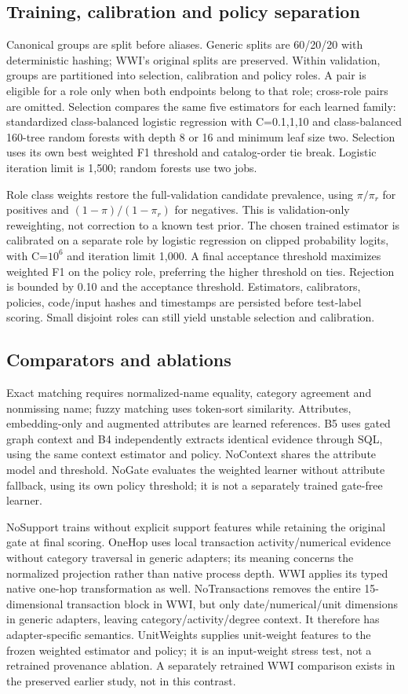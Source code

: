 \documentclass[11pt,letterpaper]{article}
\begin{document}
\subsection{Training, calibration and policy separation}
Canonical groups are split before aliases. Generic splits are 60/20/20 with deterministic hashing; WWI's original splits are preserved. Within validation, groups are partitioned into selection, calibration and policy roles. A pair is eligible for a role only when both endpoints belong to that role; cross-role pairs are omitted. Selection compares the same five estimators for each learned family: standardized class-balanced logistic regression with C=0.1,1,10 and class-balanced 160-tree random forests with depth 8 or 16 and minimum leaf size two. Selection uses its own best weighted F1 threshold and catalog-order tie break. Logistic iteration limit is 1,500; random forests use two jobs.

Role class weights restore the full-validation candidate prevalence, using $\pi/\pi_r$ for positives and $(1-\pi)/(1-\pi_r)$ for negatives. This is validation-only reweighting, not correction to a known test prior. The chosen trained estimator is calibrated on a separate role by logistic regression on clipped probability logits, with C=$10^6$ and iteration limit 1,000. A final acceptance threshold maximizes weighted F1 on the policy role, preferring the higher threshold on ties. Rejection is bounded by 0.10 and the acceptance threshold. Estimators, calibrators, policies, code/input hashes and timestamps are persisted before test-label scoring. Small disjoint roles can still yield unstable selection and calibration.

\subsection{Comparators and ablations}
Exact matching requires normalized-name equality, category agreement and nonmissing name; fuzzy matching uses token-sort similarity. Attributes, embedding-only and augmented attributes are learned references. B5 uses gated graph context and B4 independently extracts identical evidence through SQL, using the same context estimator and policy. NoContext shares the attribute model and threshold. NoGate evaluates the weighted learner without attribute fallback, using its own policy threshold; it is not a separately trained gate-free learner.

NoSupport trains without explicit support features while retaining the original gate at final scoring. OneHop uses local transaction activity/numerical evidence without category traversal in generic adapters; its meaning concerns the normalized projection rather than native process depth. WWI applies its typed native one-hop transformation as well. NoTransactions removes the entire 15-dimensional transaction block in WWI, but only date/numerical/unit dimensions in generic adapters, leaving category/activity/degree context. It therefore has adapter-specific semantics. UnitWeights supplies unit-weight features to the frozen weighted estimator and policy; it is an input-weight stress test, not a retrained provenance ablation. A separately retrained WWI comparison exists in the preserved earlier study, not in this contrast.
\end{document}
